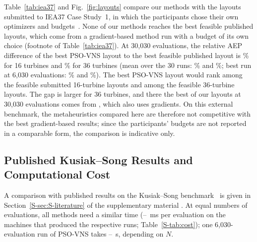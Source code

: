 Table~\ref{tab:iea37} and Fig.~\ref{fig:layouts} compare our methods with the layouts submitted to IEA37 Case Study~1, in which the participants chose their own optimizers and budgets~\cite{Baker2019}. None of our methods reaches the best feasible published layouts, which come from a gradient-based method run with a budget of its own choice (footnote of Table~\ref{tab:iea37}). At 30,030 evaluations, the relative AEP difference of the best PSO-VNS layout to the best feasible published layout is \NIEAGapSixteenThirtyK\% for 16 turbines and \NIEAGapThirtySixThirtyK\% for 36 turbines (mean over the 30 runs: \NIEAMeanGapSixteenThirtyK\% and \NIEAMeanGapThirtySixThirtyK\%; best run at 6,030 evaluations: \NIEAGapSixteenSixK\% and \NIEAGapThirtySixSixK\%). The best PSO-VNS layout would rank \NIEARankSixteenThirtyK{} among the \NIEAPubFeasSixteen{} feasible submitted 16-turbine layouts and \NIEARankThirtySixThirtyK{} among the \NIEAPubFeasThirtySix{} feasible 36-turbine layouts. The gap is larger for 36 turbines, and there the best of our layouts at 30,030 evaluations comes from \NIEABestOfThirtySixThirtyK, which also uses gradients. On this external benchmark, the metaheuristics compared here are therefore not competitive with the best gradient-based results; since the participants' budgets are not reported in a comparable form, the comparison is indicative only.

\subsection{Published Kusiak--Song Results and Computational Cost}
\label{sec:literature}
\label{sec:runtime}
A comparison with published results on the Kusiak--Song benchmark~\cite{Kusiak2010,Eroglu2012,Eroglu2013,Bansal2017} is given in Section~\ref{S-sec:S-literature} of the supplementary material . At equal numbers of evaluations, all methods need a similar time (\NMsPerCallMin--\NMsPerCallMax~ms per evaluation on the machines that produced the respective runs; Table~\ref{S-tab:cost}); one 6,030-evaluation run of PSO-VNS takes \NSecPerRunMin--\NSecPerRunMax~s, depending on $N$.
